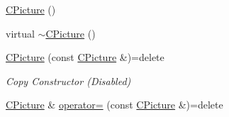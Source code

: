 \begin{DoxyCompactItemize}
\item 
\hyperlink{class_c_picture_a4e3783bef1f9d565b8a9f5e9680685ab}{C\+Picture} ()
\item 
virtual \hyperlink{class_c_picture_a763d6f41025f8e3f39c3ed264aac623c}{$\sim$\+C\+Picture} ()
\item 
\hypertarget{class_c_picture_aa74c697e3bcca50430acbfa582f7a928}{\hyperlink{class_c_picture_aa74c697e3bcca50430acbfa582f7a928}{C\+Picture} (const \hyperlink{class_c_picture}{C\+Picture} \&)=delete}\label{class_c_picture_aa74c697e3bcca50430acbfa582f7a928}

\begin{DoxyCompactList}\small\item\em Copy Constructor (Disabled) \end{DoxyCompactList}\item 
\hypertarget{class_c_picture_a8b0fe5e8e17f415d010eedab79555b6e}{\hyperlink{class_c_picture}{C\+Picture} \& \hyperlink{class_c_picture_a8b0fe5e8e17f415d010eedab79555b6e}{operator=} (const \hyperlink{class_c_picture}{C\+Picture} \&)=delete}\label{class_c_picture_a8b0fe5e8e17f415d010eedab79555b6e}


\end{DoxyCompactItemize}
